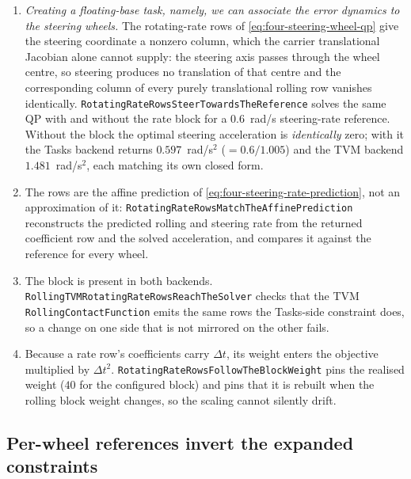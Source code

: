 \documentclass[10pt]{article}
\begin{document}
\begin{enumerate}

\item \emph{Creating a floating-base task, namely, we can associate the error
  dynamics to the steering wheels.} The rotating-rate rows of
  \eqref{eq:four-steering-wheel-qp} give the steering coordinate a nonzero
  column, which the carrier translational Jacobian alone cannot supply: the
  steering axis passes through the wheel centre, so steering produces no
  translation of that centre and the corresponding column of every purely
  translational rolling row vanishes identically.
  \texttt{RotatingRateRowsSteerTowardsTheReference} solves the same QP with and
  without the rate block for a $0.6$~rad/s steering-rate reference. Without the
  block the optimal steering acceleration is \emph{identically} zero; with it
  the Tasks backend returns $0.597$~rad/s$^2$ ($=0.6/1.005$) and the TVM backend
  $1.481$~rad/s$^2$, each matching its own closed form.

\item The rows are the affine prediction of
  \eqref{eq:four-steering-rate-prediction}, not an approximation of it:
  \texttt{RotatingRateRowsMatchTheAffinePrediction} reconstructs the predicted
  rolling and steering rate from the returned coefficient row and the solved
  acceleration, and compares it against the reference for every wheel.

\item The block is present in both backends.
  \texttt{RollingTVMRotatingRateRowsReachTheSolver} checks that the TVM
  \texttt{RollingContactFunction} emits the same rows the Tasks-side constraint
  does, so a change on one side that is not mirrored on the other fails.

\item Because a rate row's coefficients carry $\Delta t$, its weight enters the
  objective multiplied by $\Delta t^{2}$.
  \texttt{RotatingRateRowsFollowTheBlockWeight} pins the realised weight ($40$
  for the configured block) and pins that it is rebuilt when the rolling block
  weight changes, so the scaling cannot silently drift.

\end{enumerate}

\subsection{Per-wheel references invert the expanded constraints}
\label{sec:validation-references}
\end{document}
